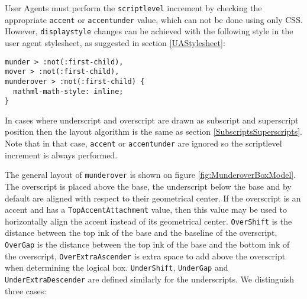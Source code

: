 User Agents must perform the {\tt scriptlevel} increment by checking
the appropriate {\tt accent} or {\tt accentunder} value, which can not be done
using only CSS. However, {\tt displaystyle} changes can be achieved with the
following style in the user agent stylesheet, as suggested in section
\ref{UAStylesheet}:
%
\begin{lstlisting}
munder > :not(:first-child),
mover > :not(:first-child),
munderover > :not(:first-child) {
  mathml-math-style: inline;
}
\end{lstlisting}
%

In cases where underscript and overscript are drawn as subscript and
superscript position then the layout algorithm is the same as section
\ref{SubscriptsSuperscripts}. Note that in that case,
{\tt accent} or {\tt accentunder} are ignored so the scriptlevel increment is
always performed.

The general layout of {\tt munderover} is shown on figure
\ref{fig:MunderoverBoxModel}.
The overscript is placed above the base, the underscript below the base
and by default are aligned with respect to their geometrical center.
If the overscript is an accent and has a {\tt TopAccentAttachment}
value, then this value may be used to horizontally align the accent instead
of its geometrical center.
{\tt OverShift} is the distance between the top ink
of the base and the baseline of the overscript, {\tt OverGap} is the distance
between the top ink of the base and the bottom ink of the overscript,
{\tt OverExtraAscender} is extra space to add above the overscript when
determining the logical box. {\tt UnderShift}, {\tt UnderGap} and
{\tt UnderExtraDescender} are defined similarly for the underscripts.
We distinguish three cases:

